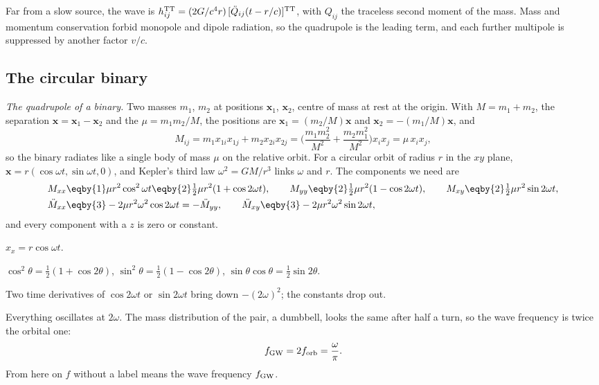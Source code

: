 \begin{keyidea}
Far from a slow source, the wave is $h_{ij}^{\rm TT}=(2G/c^4r)\,[\ddot Q_{ij}(t-r/c)]^{\rm TT}$, with $Q_{ij}$ the traceless second moment of the mass. Mass and momentum conservation forbid monopole and dipole radiation, so the quadrupole is the leading term, and each further multipole is suppressed by another factor $v/c$.
\end{keyidea}

\subsection{The circular binary}

\emph{The quadrupole of a binary.} Two masses $m_1$, $m_2$ at positions $\bm x_1$, $\bm x_2$, centre of mass at rest at the origin. With $M=m_1+m_2$, the separation $\bm x=\bm x_1-\bm x_2$ and the  $\mu=m_1m_2/M$, the positions are $\bm x_1=(m_2/M)\bm x$ and $\bm x_2=-(m_1/M)\bm x$, and
\begin{equation}
  M_{ij}=m_1x_{1i}x_{1j}+m_2x_{2i}x_{2j}=\Big(\frac{m_1m_2^2}{M^2}+\frac{m_2m_1^2}{M^2}\Big)x_ix_j=\mu\,x_ix_j ,
\end{equation}
so the binary radiates like a single body of mass $\mu$ on the relative orbit. For a circular orbit of radius $r$ in the $xy$ plane, $\bm x=r(\cos\omega t,\sin\omega t,0)$, and Kepler's third law $\omega^2=GM/r^3$ links $\omega$ and $r$. The components we need are
\begin{align}
  M_{xx}&\eqby{1}\mu r^2\cos^2\omega t\eqby{2}\tfrac12\mu r^2(1+\cos2\omega t),\qquad
  M_{yy}\eqby{2}\tfrac12\mu r^2(1-\cos2\omega t),\qquad
  M_{xy}\eqby{2}\tfrac12\mu r^2\sin2\omega t,\nonumber\\
  \ddot M_{xx}&\eqby{3}-2\mu r^2\omega^2\cos2\omega t=-\ddot M_{yy},\qquad
  \ddot M_{xy}\eqby{3}-2\mu r^2\omega^2\sin2\omega t,
  \label{T2g:eq:Mddot}
\end{align}
and every component with a $z$ is zero or constant.
\begin{explain}
  \item $x_x=r\cos\omega t$.
  \item $\cos^2\theta=\tfrac12(1+\cos2\theta)$, $\sin^2\theta=\tfrac12(1-\cos2\theta)$, $\sin\theta\cos\theta=\tfrac12\sin2\theta$.
  \item Two time derivatives of $\cos2\omega t$ or $\sin2\omega t$ bring down $-(2\omega)^2$; the constants drop out.
\end{explain}
Everything oscillates at $2\omega$. The mass distribution of the pair, a dumbbell, looks the same after half a turn, so the wave frequency is twice the orbital one:
\begin{equation}
  f_{\rm GW}=2f_{\rm orb}=\frac{\omega}{\pi}.
  \label{T2g:eq:twice}
\end{equation}
From here on $f$ without a label means the wave frequency $f_{\rm GW}$.

